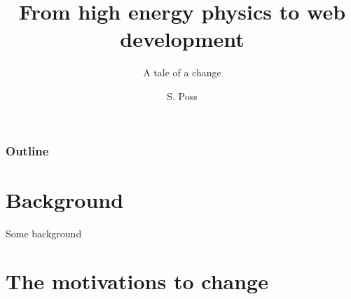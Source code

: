 \documentclass[handout]{beamer}
\author{S. Poss}
\title{From high energy physics to web development}
\subtitle{A tale of a change}
\begin{document}
\begin{frame}
\titlepage
\end{frame}

\begin{frame}
\frametitle{Outline}
\tableofcontents
\end{frame}

\section{Background}
\begin{frame}
Some background
\end{frame}

\section{The motivations to change}
\begin{frame}

\end{frame}
\end{document}
